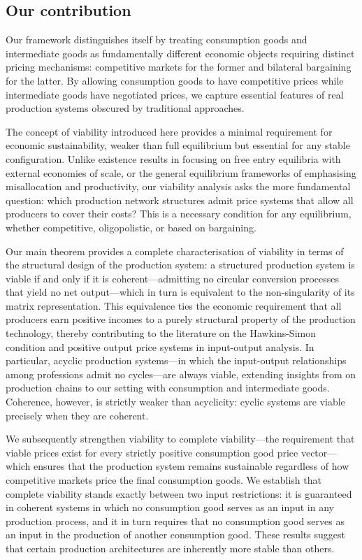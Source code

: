 \documentclass[11pt,fleqn]{article}
\begin{document}
\subsection{Our contribution}

Our framework distinguishes itself by treating consumption goods and intermediate goods as fundamentally different economic objects requiring distinct pricing mechanisms: competitive markets for the former and bilateral bargaining for the latter. By allowing consumption goods to have competitive prices while intermediate goods have negotiated prices, we capture essential features of real production systems obscured by traditional approaches.

The concept of viability introduced here provides a minimal requirement for economic sustainability, weaker than full equilibrium but essential for any stable configuration. Unlike existence results in \citet{Baqaee2018} focusing on free entry equilibria with external economies of scale, or the general equilibrium frameworks of \citet{BaqaeeFarhi2020} emphasising misallocation and productivity, our viability analysis asks the more fundamental question: which production network structures admit price systems that allow all producers to cover their costs? This is a necessary condition for any equilibrium, whether competitive, oligopolistic, or based on bargaining.

Our main theorem provides a complete characterisation of viability in terms of the structural design of the production system: a structured production system is viable if and only if it is coherent---admitting no circular conversion processes that yield no net output---which in turn is equivalent to the non-singularity of its matrix representation. This equivalence ties the economic requirement that all producers earn positive incomes to a purely structural property of the production technology, thereby contributing to the literature on the Hawkins-Simon condition and positive output price systems in input-output analysis. In particular, acyclic production systems---in which the input-output relationships among professions admit no cycles---are always viable, extending insights from \citet{Levine2012} on production chains to our setting with consumption and intermediate goods. Coherence, however, is strictly weaker than acyclicity: cyclic systems are viable precisely when they are coherent.

We subsequently strengthen viability to complete viability---the requirement that viable prices exist for every strictly positive consumption good price vector---which ensures that the production system remains sustainable regardless of how competitive markets price the final consumption goods. We establish that complete viability stands exactly between two input restrictions: it is guaranteed in coherent systems in which no consumption good serves as an input in any production process, and it in turn requires that no consumption good serves as an input in the production of another consumption good. These results suggest that certain production architectures are inherently more stable than others.
\end{document}
